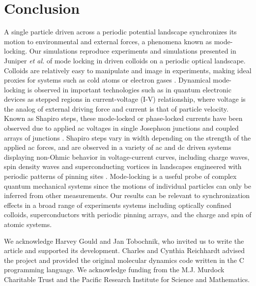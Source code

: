 \documentclass[twocolumn,showpacs,preprintnumbers,amsmath,amssymb,aps,prb]{revtex4}
\begin{document}
\section{Conclusion}
\label{sec:conclusion}	
A single particle driven across a periodic potential landscape 
synchronizes its motion 
to environmental and external forces,
a phenomena known as mode-locking.  
Our simulations reproduce experiments and simulations presented in 
Juniper {\it et al.} \cite{Juniper2015, Juniper2017}
of 
mode locking in
driven colloids on a
periodic optical landscape.
Colloids are 
relatively easy to 
manipulate and image in experiments,
making ideal proxies 
for systems 
such as cold atoms or electron gases \cite{Grier2003}.
Dynamical mode-locking 
is 
observed in important technologies such as 
in quantum electronic
devices as 
stepped regions in current-voltage (I-V) relationship,
where voltage is the analog of external driving force
and current is that of particle velocity.
Known as Shapiro steps, 
these mode-locked or phase-locked currents  
have been observed due to applied ac voltages in 
single Josephson junctions \cite{Shapiro1963, Golubov2004} and
coupled arrays of junctions \cite{Benz1990}.
Shapiro steps vary in width depending on the strength of the
applied ac forces,
and are observed in a variety of ac and dc driven systems
displaying
non-Ohmic behavior in voltage-current curves,
including
charge waves, spin density waves
and superconducting vortices in landscapes 
engineered with periodic patterns of pinning sites \cite{Reichhardt2000}.
Mode-locking is a useful probe 
of complex quantum mechanical systems
since the motions of individual particles can only be inferred
from other measurements.
Our results can be relevant 
to synchronization effects
in a broad range of experiments systems
including optically confined colloids,
superconductors with periodic pinning arrays, 
and the charge and spin of atomic systems.

\begin{acknowledgments}

  We acknowledge Harvey Gould and Jan Tobochnik,
  who invited us to write the article and
  supported its development.
  Charles and Cynthia Reichhardt advised 
  the project and provided the original molecular dynamics code
  written in the C programming language.
  We acknowledge funding from the M.J. Murdock Charitable Trust
  and the Pacific Research Institute for Science and Mathematics. %

\end{acknowledgments}
\end{document}
